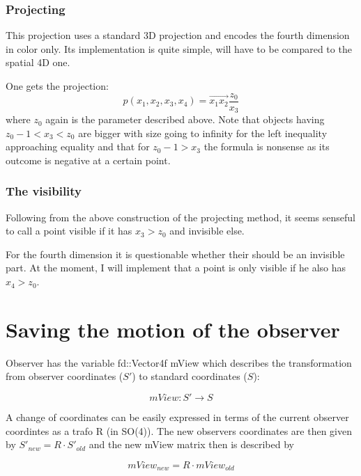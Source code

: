 \documentclass[titlepage]{scrartcl}
\begin{document}
\subsubsection{Projecting}
This projection uses a standard 3D projection and encodes the fourth dimension in color only. Its implementation is quite simple, will have to be compared to the spatial 4D one. 

One gets the projection:
\begin{equation}
p(x_1, x_2, x_3, x_4) =  \vec{x_1 x_2} \frac{z_0}{x_3}
\end{equation}
where $z_0$ again is the parameter described above. Note that objects having $z_0 - 1 < x_3 < z_0$ are bigger with size going to infinity for the left inequality approaching equality and that for $z_0 - 1 > x_3$ the formula is nonsense as its outcome is negative at a certain point. 

\subsubsection{The visibility}

Following from the above construction of the projecting method, it seems senseful to call a point visible if it has $x_3 > z_0$ and invisible else. 

For the fourth dimension it is questionable whether their should be an invisible part. At the moment, I will implement that a point is only visible if he also has $x_4 > z_0$. 

\section{Saving the motion of the observer}

Observer has the variable fd::Vector4f mView which describes the transformation from observer coordinates ($S'$) to standard coordinates ($S$):

\begin{equation}
mView: S' \to S
\end{equation}

A change of coordinates can be easily expressed in terms of the current observer coordintes as a trafo R (in SO(4)). The new observers coordinates are then given by $S'_{new} = R \cdot S'_{old}$ and the new mView matrix then is described by 

\begin{equation}
mView_{new} = R \cdot mView_{old} 
\end{equation}
\end{document}
